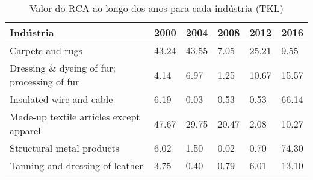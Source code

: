 \begin{table}
\centering
\caption{Valor do RCA ao longo dos anos para cada indústria (TKL)}
\begin{tabular}{p{6cm}p{1.5cm}p{1.5cm}p{1.5cm}p{1.5cm}p{1.5cm}}
\toprule
                                  Indústria &  2000 &  2004 &  2008 &  2012 &  2016 \\
\midrule
                           Carpets and rugs & 43.24 & 43.55 &  7.05 & 25.21 &  9.55 \\
Dressing \& dyeing of fur; processing of fur &  4.14 &  6.97 &  1.25 & 10.67 & 15.57 \\
                   Insulated wire and cable &  6.19 &  0.03 &  0.53 &  0.53 & 66.14 \\
    Made-up textile articles except apparel & 47.67 & 29.75 & 20.47 &  2.08 & 10.27 \\
                  Structural metal products &  6.02 &  1.50 &  0.02 &  0.70 & 74.30 \\
            Tanning and dressing of leather &  3.75 &  0.40 &  0.79 &  6.01 & 13.10 \\
\bottomrule
\end{tabular}
\end{table}
